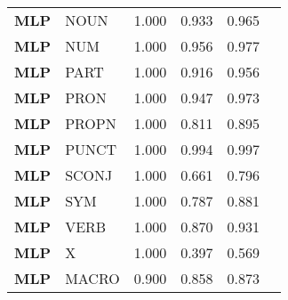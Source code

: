 \begin{table}
\begin{tabular}{|l|l|l|l|l|l|}
\textbf{MLP} & NOUN & 1.000 & 0.933 & 0.965 \\
\textbf{MLP} & NUM & 1.000 & 0.956 & 0.977 \\
\textbf{MLP} & PART & 1.000 & 0.916 & 0.956 \\
\textbf{MLP} & PRON & 1.000 & 0.947 & 0.973 \\
\textbf{MLP} & PROPN & 1.000 & 0.811 & 0.895 \\
\textbf{MLP} & PUNCT & 1.000 & 0.994 & 0.997 \\
\textbf{MLP} & SCONJ & 1.000 & 0.661 & 0.796 \\
\textbf{MLP} & SYM & 1.000 & 0.787 & 0.881 \\
\textbf{MLP} & VERB & 1.000 & 0.870 & 0.931 \\
\textbf{MLP} & X & 1.000 & 0.397 & 0.569 \\
\textbf{MLP} & MACRO & 0.900 & 0.858 & 0.873 \\
\bottomrule
\end{tabular}
\end{table}
